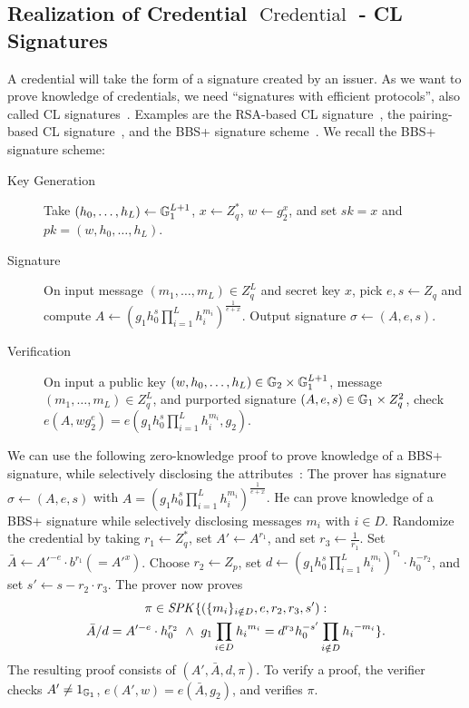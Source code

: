 \subsection{Realization of Credential $\operatorname{Credential}$ - CL Signatures}
A credential will take the form of a signature created by an issuer. 
As we want to prove knowledge of credentials, we need ``signatures with efficient protocols'', also called CL signatures~\cite{camlys02b}. 
Examples are the RSA-based CL signature~\cite{camlys02b}, the pairing-based CL signature~\cite{camlys04},
and the BBS+ signature scheme~\cite{bobosh04,ASMC13}. 
We recall the BBS+ signature scheme:
\begin{description}
\item[Key Generation] Take $(h_0, \ldots, h_L) \gets \mathbb{G}_1^{L+1}$, $x \gets Z_q^*$, $w \gets g_2^x$, and set $sk = x$ and $pk = (w, h_0, \ldots, h_L)$.
\item[Signature] On input message $(m_1, \ldots, m_L) \in Z_q^L$ and secret key $x$, 
pick $e, s \gets Z_q$ and compute $A \gets (g_1 h_0^s \prod_{i = 1}^{L} h_i^{m_{i}})^{\frac{1}{e+x}}$.
Output signature $\sigma \gets (A, e, s)$.
\item[Verification] On input a public key $(w, h_0, \ldots, h_L) \in \mathbb{G}_2 \times \mathbb{G}_1^{L+1}$, 
message $(m_1, \ldots, m_L) \in Z_q^L$, and purported signature $(A, e, s) \in \mathbb{G}_1 \times Z_q^2$, 
check $e(A, w g_2^e) = e(g_1 h_0^s \prod_{i = 1}^{L} h_i^{m_{i}}, g_2)$.
\end{description}

We can use the following zero-knowledge proof to prove knowledge of a BBS+ signature, while selectively disclosing the attributes~\cite{CDL16eprint}:
The prover has signature $\sigma \gets (A, e, s)$ with $A = (g_1 h_0^s \prod_{i = 1}^{L} h_i^{m_{i}})^{\frac{1}{e+x}}$.
He can prove knowledge of a BBS+ signature while selectively disclosing messages $m_i$ with $i \in D$.
Randomize the credential by taking $r_1 \gets Z_q^*$, set $A' \gets A^{r_1}$, and set $r_3 \gets \frac{1}{r_1}$.
Set $\bar{A} \gets A'^{-e} \cdot b^{r_1} (= A'^{x})$.
Choose $r_2 \gets Z_p$, set $d \gets (g_1 h_0^s \prod_{i = 1}^{L} h_i^{m_{i}})^{r_1} \cdot h_0^{-r_2}$, and set $s' \gets s - r_2 \cdot r_3$.
The prover now proves 
\begin{multline*}
\pi \in \mathit{SPK}\{(\{m_i\}_{i \notin D}, e, r_2, r_3, s') : \\
\bar{A}/d = A'^{-e} \cdot h_0^{r_2} ~\land~ g_1 \prod_{i \in D} {h_{i}}^{m_i}= d^{r_3}h_0^{-s'} \prod_{i \notin D} {h_{i}}^{-m_i}\}.
\end{multline*}
The resulting proof consists of $(A', \bar{A}, d, \pi)$.
To verify a proof, the verifier checks $A' \neq 1_{\mathbb{G}_1}$, $e(A', w) = e(\bar{A}, g_2)$, and verifies $\pi$.

